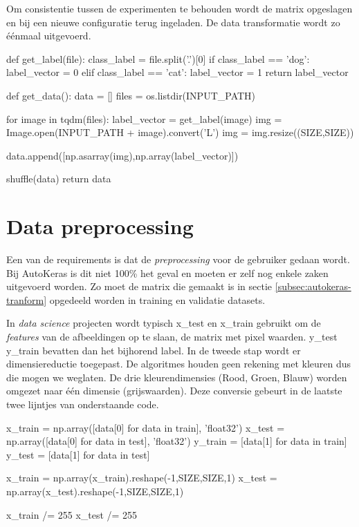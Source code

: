 Om consistentie tussen de experimenten te behouden wordt de matrix opgeslagen en bij een nieuwe configuratie terug ingeladen. De data transformatie wordt zo éénmaal uitgevoerd.

\bigskip

\begin{python}
def get_label(file):
    class_label = file.split('.')[0]
    if class_label == 'dog': label_vector = 0
    elif class_label == 'cat': label_vector = 1
    return label_vector
    
def get_data():
    data = []
    files = os.listdir(INPUT_PATH)
    
    for image in tqdm(files):
        label_vector = get_label(image)
        img = Image.open(INPUT_PATH + image).convert('L')
        img = img.resize((SIZE,SIZE))
    
        data.append([np.asarray(img),np.array(label_vector)])
        
    shuffle(data)
    return data

\end{python}

\section{Data preprocessing}
\label{sec:preprocessing-autokeras}

Een van de requirements is dat de \textit{preprocessing} voor de gebruiker gedaan wordt. Bij AutoKeras is dit niet 100\% het geval en moeten er zelf nog enkele zaken uitgevoerd worden. Zo moet de matrix die gemaakt is in sectie \ref{subsec:autokeras-tranform} opgedeeld worden in training en validatie datasets.

In \textit{data science} projecten wordt typisch x\_test en x\_train gebruikt om de \textit{features} van de afbeeldingen op te slaan, de matrix met pixel waarden. y\_test y\_train bevatten dan het bijhorend label. In de tweede stap wordt er dimensiereductie toegepast. De algoritmes houden geen rekening met kleuren dus die mogen we weglaten. De drie kleurendimensies (Rood, Groen, Blauw) worden omgezet naar één dimensie (grijswaarden). Deze conversie gebeurt in de laatste twee lijntjes van onderstaande code.

\bigskip

\begin{python}
x_train = np.array([data[0] for data in train], 'float32')
x_test = np.array([data[0] for data in test], 'float32')
y_train = [data[1] for data in train]
y_test = [data[1] for data in test]

x_train = np.array(x_train).reshape(-1,SIZE,SIZE,1)
x_test = np.array(x_test).reshape(-1,SIZE,SIZE,1)

x_train /= 255
x_test /= 255
\end{python}

